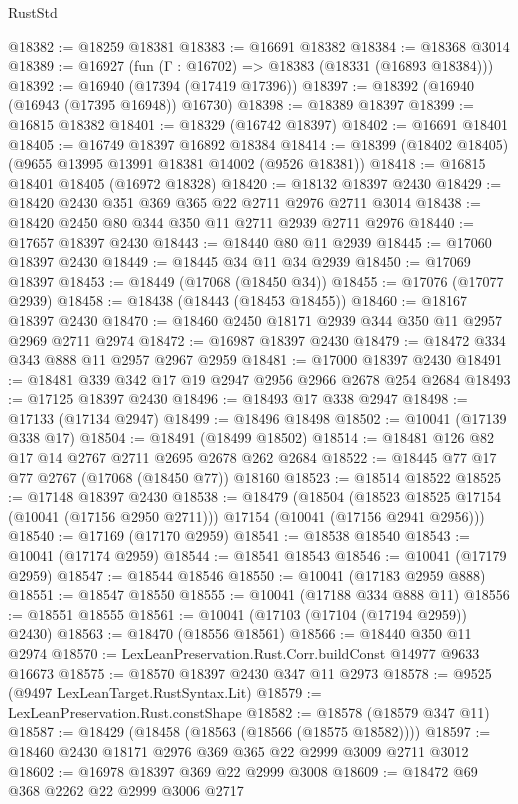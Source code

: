 \begin{lexlean}{RustStd}
\begin{coremodule}
@18382 := @18259 @18381
@18383 := @16691 @18382
@18384 := @18368 @3014
@18389 := @16927 (fun (Γ : @16702) => @18383 (@18331 (@16893 @18384)))
@18392 := @16940 (@17394 (@17419 @17396))
@18397 := @18392 (@16940 (@16943 (@17395 @16948)) @16730)
@18398 := @18389 @18397
@18399 := @16815 @18382
@18401 := @18329 (@16742 @18397)
@18402 := @16691 @18401
@18405 := @16749 @18397 @16892 @18384
@18414 := @18399 (@18402 @18405) (@9655 @13995 @13991 @18381 @14002 (@9526 @18381))
@18418 := @16815 @18401 @18405 (@16972 @18328)
@18420 := @18132 @18397 @2430
@18429 := @18420 @2430 @351 @369 @365 @22 @2711 @2976 @2711 @3014
@18438 := @18420 @2450 @80 @344 @350 @11 @2711 @2939 @2711 @2976
@18440 := @17657 @18397 @2430
@18443 := @18440 @80 @11 @2939
@18445 := @17060 @18397 @2430
@18449 := @18445 @34 @11 @34 @2939
@18450 := @17069 @18397
@18453 := @18449 (@17068 (@18450 @34))
@18455 := @17076 (@17077 @2939)
@18458 := @18438 (@18443 (@18453 @18455))
@18460 := @18167 @18397 @2430
@18470 := @18460 @2450 @18171 @2939 @344 @350 @11 @2957 @2969 @2711 @2974
@18472 := @16987 @18397 @2430
@18479 := @18472 @334 @343 @888 @11 @2957 @2967 @2959
@18481 := @17000 @18397 @2430
@18491 := @18481 @339 @342 @17 @19 @2947 @2956 @2966 @2678 @254 @2684
@18493 := @17125 @18397 @2430
@18496 := @18493 @17 @338 @2947
@18498 := @17133 (@17134 @2947)
@18499 := @18496 @18498
@18502 := @10041 (@17139 @338 @17)
@18504 := @18491 (@18499 @18502)
@18514 := @18481 @126 @82 @17 @14 @2767 @2711 @2695 @2678 @262 @2684
@18522 := @18445 @77 @17 @77 @2767 (@17068 (@18450 @77)) @18160
@18523 := @18514 @18522
@18525 := @17148 @18397 @2430
@18538 := @18479
    (@18504
      (@18523 @18525 @17154 (@10041 (@17156 @2950 @2711)))
      @17154
      (@10041 (@17156 @2941 @2956)))
@18540 := @17169 (@17170 @2959)
@18541 := @18538 @18540
@18543 := @10041 (@17174 @2959)
@18544 := @18541 @18543
@18546 := @10041 (@17179 @2959)
@18547 := @18544 @18546
@18550 := @10041 (@17183 @2959 @888)
@18551 := @18547 @18550
@18555 := @10041 (@17188 @334 @888 @11)
@18556 := @18551 @18555
@18561 := @10041 (@17103 (@17104 (@17194 @2959)) @2430)
@18563 := @18470 (@18556 @18561)
@18566 := @18440 @350 @11 @2974
@18570 := LexLeanPreservation.Rust.Corr.buildConst @14977 @9633 @16673
@18575 := @18570 @18397 @2430 @347 @11 @2973
@18578 := @9525 (@9497 LexLeanTarget.RustSyntax.Lit)
@18579 := LexLeanPreservation.Rust.constShape
@18582 := @18578 (@18579 @347 @11)
@18587 := @18429 (@18458 (@18563 (@18566 (@18575 @18582))))
@18597 := @18460 @2430 @18171 @2976 @369 @365 @22 @2999 @3009 @2711 @3012
@18602 := @16978 @18397 @369 @22 @2999 @3008
@18609 := @18472 @69 @368 @2262 @22 @2999 @3006 @2717

\end{coremodule}
\end{lexlean}
